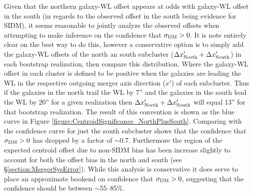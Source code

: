 Given that the northern galaxy-WL offset appears at odds with galaxy-WL offset in the south (in regards to the observed offset in the south being evidence for SIDM), it seems reasonable to jointly analyze the observed offsets when attempting to make inference on the confidence that $\sigma_{\rm DM}>0$. 
It is note entirely clear on the best way to do this, however a conservative option is to simply add the galaxy-WL offsets of the north an south subcluster ($\Delta x'_{\rm North}+\Delta x'_{\rm South}$) in each bootstrap realization, then compare this distribution.
Where the galaxy-WL offset in each cluster is defined to be positive when the galaxies are leading the WL in the respective outgoing merger axis direction ($x'$) of each subcluster.
Thus if the galaxies in the north trail the WL by 7'' and the galaxies in the south lead the WL by 20'' for a given realization then $\Delta x'_{\rm North}+\Delta x'_{\rm South}$ will equal 13'' for that bootstrap realization.
The result of this convention is shown as the blue curve in Figure \ref{figure:CentroidSignificance_NorthPlusSouth}.
Comparing with the confidence curve for just the south subcluster shows that the confidence that $\sigma_{\rm DM}>0$ has dropped by a factor of $\sim$0.7.
Furthermore the region of the expected centroid offset due to non-SIDM bias has been increase slightly to account for both the offset bias in the north and south (see \S\ref{section:MergerSysError}).
While this analysis is conservative it does serve to place an approximate bookend on confidence that $\sigma_{\rm DM}>0$, suggesting that the confidence should be between $\sim$55--85\%.

